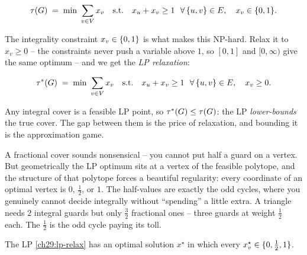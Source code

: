 \begin{equation}
\label{ch29:ip}
\tau(G)\;=\;\min\ \sum_{v\in V} x_v
  \quad\text{s.t.}\quad x_u+x_v\ge 1\ \ \forall\,\{u,v\}\in E,\quad x_v\in\{0,1\}.
\end{equation}

The integrality constraint $x_v\in\{0,1\}$ is what makes this NP-hard. Relax it
to $x_v\ge 0$ -- the constraints never push a variable above $1$, so $[0,1]$ and
$[0,\infty)$ give the same optimum -- and we get the \emph{LP relaxation}:

\begin{equation}
\label{ch29:lp-relax}
\tau^*(G)\;=\;\min\ \sum_{v\in V} x_v
  \quad\text{s.t.}\quad x_u+x_v\ge 1\ \ \forall\,\{u,v\}\in E,\quad x_v\ge 0.
\end{equation}

Any integral cover is a feasible LP point, so $\tau^*(G)\le\tau(G)$: the LP
\emph{lower-bounds} the true cover. The gap between them is the price of
relaxation, and bounding it is the approximation game.

\begin{intuitionbox}
A fractional cover sounds nonsensical -- you cannot put half a guard on a
vertex. But geometrically the LP optimum sits at a vertex of the feasible
polytope, and the structure of that polytope forces a beautiful regularity:
every coordinate of an optimal vertex is $0$, $\tfrac12$, or $1$. The
half-values are exactly the odd cycles, where you genuinely cannot decide
integrally without ``spending'' a little extra. A triangle needs $2$ integral
guards but only $\tfrac32$ fractional ones -- three guards at weight $\tfrac12$
each. The $\tfrac12$ is the odd cycle paying its toll.
\end{intuitionbox}

\begin{theorem}
\label{ch29:thm-half}
The LP \eqref{ch29:lp-relax} has an optimal solution $x^\star$ in which every
$x^\star_v\in\{0,\tfrac12,1\}$.
\end{theorem}

